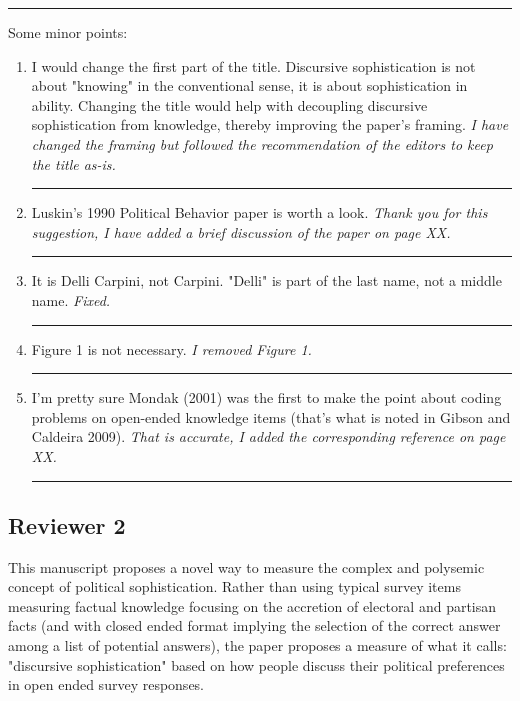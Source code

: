 \rule{\linewidth}{.01cm}

Some minor points:


\begin{enumerate}
\item I would change the first part of the title. Discursive sophistication is not about "knowing" in the conventional sense, it is about sophistication in ability. Changing the title would help with decoupling discursive sophistication from knowledge, thereby improving the paper's framing.
\vspace{.5em}\newline\textit{I have changed the framing but followed the recommendation of the editors to keep the title as-is.}\newline\rule{\linewidth}{.01cm}
\item Luskin's 1990 Political Behavior paper is worth a look.
\vspace{.5em}\newline\textit{Thank you for this suggestion, I have added a brief discussion of the paper on page XX.}\newline\rule{\linewidth}{.01cm}
\item It is Delli Carpini, not Carpini. "Delli" is part of the last name, not a middle name.
\vspace{.5em}\newline\textit{Fixed.}\newline\rule{\linewidth}{.01cm}
\item Figure 1 is not necessary.
\vspace{.5em}\newline\textit{I removed Figure 1.}\newline\rule{\linewidth}{.01cm}
\item I'm pretty sure Mondak (2001) was the first to make the point about coding problems on open-ended knowledge items (that's what is noted in Gibson and Caldeira 2009).
\vspace{.5em}\newline\textit{That is accurate, I added the corresponding reference on page XX.}\newline\rule{\linewidth}{.01cm}
\end{enumerate}


\subsection*{Reviewer 2}

This manuscript proposes a novel way to measure the complex and polysemic concept of political sophistication. Rather than using typical survey items measuring factual knowledge focusing on the accretion of electoral and partisan facts (and with closed ended format implying the selection of the correct answer among a list of potential answers), the paper proposes a measure of what it calls: "discursive sophistication" based on how people discuss their political preferences in open ended survey responses. 


